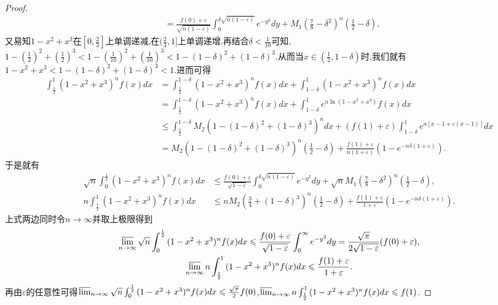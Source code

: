 \documentclass[../../main.tex]{subfiles}
\begin{document}
\begin{proof}
\begin{align*}
&=\frac{f(0) + \varepsilon}{\sqrt{n(1 - \varepsilon)}}\int_0^{\delta\sqrt{n(1 - \varepsilon)}}{e^{-y^2}dy}+M_1\left(\frac{7}{8}-\delta^2\right)^n\left(\frac{1}{2}-\delta\right),
\end{align*}
又易知$1-x^2+x^3$在$[0,\frac{2}{3}]$上单调递减,在$(\frac{2}{3},1]$上单调递增.再结合$\delta<\frac{1}{10}$可知,$1-(\frac{1}{2})^2+(\frac{1}{2})^3<1-(\frac{1}{10})^2+(\frac{1}{10})^3<1-(1-\delta)^2+(1-\delta)^3$.从而当$x\in (\frac{1}{2},1-\delta)$时,我们就有$1-x^2+x^3<1-(1-\delta)^2+(1-\delta)^3<1$.进而可得
\begin{align*}
\int_{\frac{1}{2}}^1{(1 - x^2 + x^3)^nf(x)dx}&=\int_{\frac{1}{2}}^{1 - \delta}{(1 - x^2 + x^3)^nf(x)dx}+\int_{1 - \delta}^1{(1 - x^2 + x^3)^nf(x)dx}\\
&=\int_{\frac{1}{2}}^{1 - \delta}{(1 - x^2 + x^3)^nf(x)dx}+\int_{1 - \delta}^1{e^{n\ln(1 - x^2 + x^3)}f(x)dx}\\
&\leqslant \int_{\frac{1}{2}}^{1 - \delta}{M_2\left(1-(1-\delta)^2+(1 - \delta)^3\right)^ndx}+(f(1) + \varepsilon)\int_{1 - \delta}^1{e^{n[x - 1 + \varepsilon(x - 1)]}dx}\\
&=M_2\left(1-(1-\delta)^2+(1 - \delta)^3\right)^n\left(\frac{1}{2}-\delta\right)+\frac{f(1) + \varepsilon}{n(1 + \varepsilon)}\left(1 - e^{-n\delta(1 + \varepsilon)}\right).
\end{align*}
于是就有
\begin{align*}
\sqrt{n}\int_0^{\frac{1}{2}}{(1 - x^2 + x^3)^nf(x)dx}&\leqslant \frac{f(0) + \varepsilon}{\sqrt{1 - \varepsilon}}\int_0^{\delta\sqrt{n(1 - \varepsilon)}}{e^{-y^2}dy}+\sqrt{n} M_1\left(\frac{7}{8}-\delta^2\right)^n\left(\frac{1}{2}-\delta\right),\\
n\int_{\frac{1}{2}}^1{(1 - x^2 + x^3)^nf(x)dx}&\leqslant n M_2\left(\frac{3}{4}+(1 - \delta)^3\right)^n\left(\frac{1}{2}-\delta\right)+\frac{f(1) + \varepsilon}{1 + \varepsilon}\left(1 - e^{-n\delta(1 + \varepsilon)}\right).
\end{align*}
上式两边同时令\(n\rightarrow\infty\)并取上极限得到
\begin{gather*}
\varlimsup_{n\rightarrow\infty}\sqrt{n}\int_0^{\frac{1}{2}}{(1 - x^2 + x^3)^nf(x)dx}\leqslant \frac{f(0) + \varepsilon}{\sqrt{1 - \varepsilon}}\int_0^{\infty}{e^{-y^2}dy}=\frac{\sqrt{\pi}}{2\sqrt{1 - \varepsilon}}(f(0) + \varepsilon),\\
\varlimsup_{n\rightarrow\infty}n\int_{\frac{1}{2}}^1{(1 - x^2 + x^3)^nf(x)dx}\leqslant \frac{f(1) + \varepsilon}{1 + \varepsilon}.
\end{gather*}
再由\(\varepsilon\)的任意性可得\(\varlimsup_{n\rightarrow\infty}\sqrt{n}\int_0^{\frac{1}{2}}{(1 - x^2 + x^3)^nf(x)dx}\leqslant \frac{\sqrt{\pi}}{2}f(0)\),\(\varlimsup_{n\rightarrow\infty}n\int_{\frac{1}{2}}^1{(1 - x^2 + x^3)^nf(x)dx}\leqslant f(1)\).


\end{proof}
\end{document}
